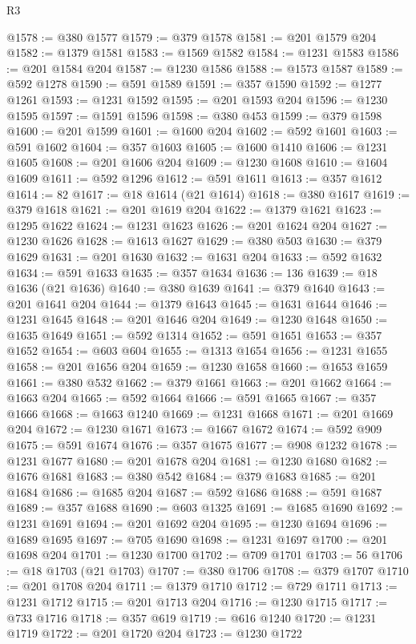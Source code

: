 \begin{lexlean}{R3}
\begin{coremodule}
@1578 := @380 @1577
@1579 := @379 @1578
@1581 := @201 @1579 @204
@1582 := @1379 @1581
@1583 := @1569 @1582
@1584 := @1231 @1583
@1586 := @201 @1584 @204
@1587 := @1230 @1586
@1588 := @1573 @1587
@1589 := @592 @1278
@1590 := @591 @1589
@1591 := @357 @1590
@1592 := @1277 @1261
@1593 := @1231 @1592
@1595 := @201 @1593 @204
@1596 := @1230 @1595
@1597 := @1591 @1596
@1598 := @380 @453
@1599 := @379 @1598
@1600 := @201 @1599
@1601 := @1600 @204
@1602 := @592 @1601
@1603 := @591 @1602
@1604 := @357 @1603
@1605 := @1600 @1410
@1606 := @1231 @1605
@1608 := @201 @1606 @204
@1609 := @1230 @1608
@1610 := @1604 @1609
@1611 := @592 @1296
@1612 := @591 @1611
@1613 := @357 @1612
@1614 := 82
@1617 := @18 @1614 (@21 @1614)
@1618 := @380 @1617
@1619 := @379 @1618
@1621 := @201 @1619 @204
@1622 := @1379 @1621
@1623 := @1295 @1622
@1624 := @1231 @1623
@1626 := @201 @1624 @204
@1627 := @1230 @1626
@1628 := @1613 @1627
@1629 := @380 @503
@1630 := @379 @1629
@1631 := @201 @1630
@1632 := @1631 @204
@1633 := @592 @1632
@1634 := @591 @1633
@1635 := @357 @1634
@1636 := 136
@1639 := @18 @1636 (@21 @1636)
@1640 := @380 @1639
@1641 := @379 @1640
@1643 := @201 @1641 @204
@1644 := @1379 @1643
@1645 := @1631 @1644
@1646 := @1231 @1645
@1648 := @201 @1646 @204
@1649 := @1230 @1648
@1650 := @1635 @1649
@1651 := @592 @1314
@1652 := @591 @1651
@1653 := @357 @1652
@1654 := @603 @604
@1655 := @1313 @1654
@1656 := @1231 @1655
@1658 := @201 @1656 @204
@1659 := @1230 @1658
@1660 := @1653 @1659
@1661 := @380 @532
@1662 := @379 @1661
@1663 := @201 @1662
@1664 := @1663 @204
@1665 := @592 @1664
@1666 := @591 @1665
@1667 := @357 @1666
@1668 := @1663 @1240
@1669 := @1231 @1668
@1671 := @201 @1669 @204
@1672 := @1230 @1671
@1673 := @1667 @1672
@1674 := @592 @909
@1675 := @591 @1674
@1676 := @357 @1675
@1677 := @908 @1232
@1678 := @1231 @1677
@1680 := @201 @1678 @204
@1681 := @1230 @1680
@1682 := @1676 @1681
@1683 := @380 @542
@1684 := @379 @1683
@1685 := @201 @1684
@1686 := @1685 @204
@1687 := @592 @1686
@1688 := @591 @1687
@1689 := @357 @1688
@1690 := @603 @1325
@1691 := @1685 @1690
@1692 := @1231 @1691
@1694 := @201 @1692 @204
@1695 := @1230 @1694
@1696 := @1689 @1695
@1697 := @705 @1690
@1698 := @1231 @1697
@1700 := @201 @1698 @204
@1701 := @1230 @1700
@1702 := @709 @1701
@1703 := 56
@1706 := @18 @1703 (@21 @1703)
@1707 := @380 @1706
@1708 := @379 @1707
@1710 := @201 @1708 @204
@1711 := @1379 @1710
@1712 := @729 @1711
@1713 := @1231 @1712
@1715 := @201 @1713 @204
@1716 := @1230 @1715
@1717 := @733 @1716
@1718 := @357 @619
@1719 := @616 @1240
@1720 := @1231 @1719
@1722 := @201 @1720 @204
@1723 := @1230 @1722

\end{coremodule}
\end{lexlean}
